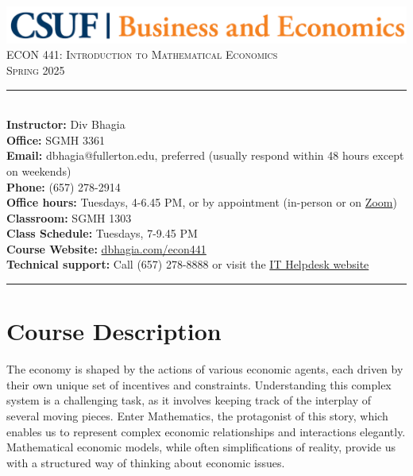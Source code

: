 \documentclass{./../Latex/syllabus}
\begin{document}
\begin{center}
\includegraphics[scale=0.22]{CBE-Wordmark-CMYK} \\ \vspace{0.5em}
{\large \textsc{ECON 441: Introduction to Mathematical Economics}} \\
{\large \textsc{Spring 2025}}
\end{center}

\begin{center}
\begin{minipage}[t]{\textwidth}
\rule{\textwidth}{0.5pt} \\
\textbf{Instructor:} Div Bhagia \\
\textbf{Office:} SGMH 3361 \\
\textbf{Email:} dbhagia@fullerton.edu, preferred (usually respond within 48 hours except on weekends) \\
\textbf{Phone:} (657) 278-2914 \\
\textbf{Office hours:} Tuesdays, 4-6.45 PM, or by appointment (in-person or on \href{https://fullerton.zoom.us/j/81895171931}{Zoom}) \\
\textbf{Classroom:} SGMH 1303 \\
\textbf{Class Schedule:} Tuesdays, 7-9.45 PM \\
\textbf{Course Website:} \href{https://dbhagia.com/econ441}{dbhagia.com/econ441} \\
\textbf{Technical support:} Call (657) 278-8888 or visit the \href{https://www.fullerton.edu/it/students/helpdesk/index.php}{IT Helpdesk website} \\
\rule{\textwidth}{0.5pt} 
\end{minipage}
\end{center}

\vspace{0.1em}
\section*{Course Description}


The economy is shaped by the actions of various economic agents, each driven by their own unique set of incentives and constraints. Understanding this complex system is a challenging task, as it involves keeping track of the interplay of several moving pieces. Enter Mathematics, the protagonist of this story, which enables us to represent complex economic relationships and interactions elegantly. Mathematical economic models, while often simplifications of reality, provide us with a structured way of thinking about economic issues.
\end{document}
